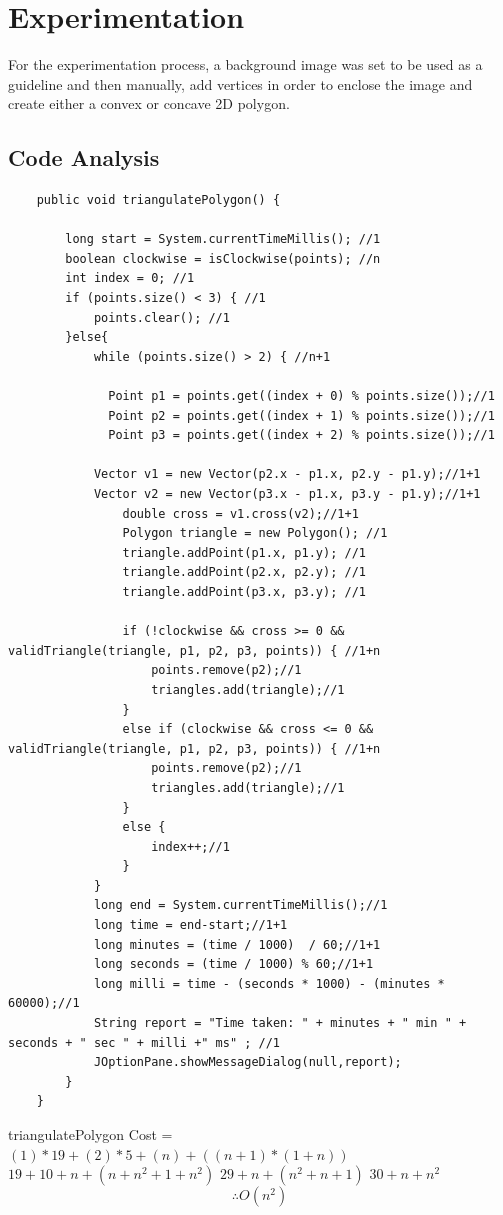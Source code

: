 \documentclass[conference]{IEEEtran}
\begin{document}
\section{Experimentation}
For the experimentation process, a background image was set to be used as a guideline and then manually, add vertices in order to enclose the image and create either a convex or concave 2D polygon.
\subsection{Code Analysis}
\begin{lstlisting}
    public void triangulatePolygon() {
      
        long start = System.currentTimeMillis(); //1
        boolean clockwise = isClockwise(points); //n
        int index = 0; //1
        if (points.size() < 3) { //1
            points.clear(); //1
        }else{
            while (points.size() > 2) { //n+1

              Point p1 = points.get((index + 0) % points.size());//1
              Point p2 = points.get((index + 1) % points.size());//1
              Point p3 = points.get((index + 2) % points.size());//1

            Vector v1 = new Vector(p2.x - p1.x, p2.y - p1.y);//1+1
            Vector v2 = new Vector(p3.x - p1.x, p3.y - p1.y);//1+1
                double cross = v1.cross(v2);//1+1
                Polygon triangle = new Polygon(); //1
                triangle.addPoint(p1.x, p1.y); //1
                triangle.addPoint(p2.x, p2.y); //1
                triangle.addPoint(p3.x, p3.y); //1

                if (!clockwise && cross >= 0 && validTriangle(triangle, p1, p2, p3, points)) { //1+n
                    points.remove(p2);//1
                    triangles.add(triangle);//1
                }
                else if (clockwise && cross <= 0 && validTriangle(triangle, p1, p2, p3, points)) { //1+n
                    points.remove(p2);//1
                    triangles.add(triangle);//1
                }
                else {
                    index++;//1
                }
            }
            long end = System.currentTimeMillis();//1
            long time = end-start;//1+1
            long minutes = (time / 1000)  / 60;//1+1
            long seconds = (time / 1000) % 60;//1+1
            long milli = time - (seconds * 1000) - (minutes * 60000);//1
            String report = "Time taken: " + minutes + " min " + seconds + " sec " + milli +" ms" ; //1
            JOptionPane.showMessageDialog(null,report);
        }
    }
\end{lstlisting}
triangulatePolygon Cost =
\newline
$(1)*19 +(2)*5+(n)+((n+1)*(1+n))$
\newline
$19+10+n+(n+n^2+1+n^2)$
\newline
$29+n+(n^2+n+1)$
$30+n+n^2$
$$\therefore O(n^2)$$
\end{document}
